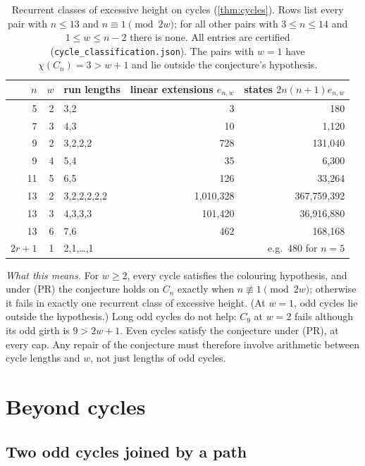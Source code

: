 \documentclass[11pt,a4paper]{article}
\theoremstyle{plain}
\theoremstyle{plain}
\newcommand{\what}[1]{\par\smallskip\noindent\textit{What this means.} #1\par\smallskip}
\begin{document}
\begin{table}[t]
\centering\small
\caption{Recurrent classes of excessive height on cycles (\cref{thm:cycles}). Rows list every pair with $n\le13$ and $n\equiv1\pmod{2w}$; for all other pairs with $3\le n\le14$ and $1\le w\le n-2$ there is none. All entries are certified (\texttt{cycle\_classification.json}). The pairs with $w=1$ have $\chi(C_n)=3>w+1$ and lie outside the conjecture's hypothesis.}
\label{tab:cycles}
\begin{tabular}{rrlrr}
\toprule
$n$ & $w$ & run lengths & linear extensions $e_{n,w}$ & states $2n(n+1)e_{n,w}$\\
\midrule
5 & 2 & 3,2 & 3 & 180\\
7 & 3 & 4,3 & 10 & 1{,}120\\
9 & 2 & 3,2,2,2 & 728 & 131{,}040\\
9 & 4 & 5,4 & 35 & 6{,}300\\
11 & 5 & 6,5 & 126 & 33{,}264\\
13 & 2 & 3,2,2,2,2,2 & 1{,}010{,}328 & 367{,}759{,}392\\
13 & 3 & 4,3,3,3 & 101{,}420 & 36{,}916{,}880\\
13 & 6 & 7,6 & 462 & 168{,}168\\
\midrule
$2r+1$ & 1 & 2,1,\dots,1 & & e.g.\ 480 for $n=5$\\
\bottomrule
\end{tabular}
\end{table}

\what{For $w\ge2$, every cycle satisfies the colouring hypothesis, and under (PR) the conjecture holds on $C_n$ exactly when $n\not\equiv1\pmod{2w}$; otherwise it fails in exactly one recurrent class of excessive height. (At $w=1$, odd cycles lie outside the hypothesis.) Long odd cycles do not help: $C_9$ at $w=2$ fails although its odd girth is $9>2w+1$. Even cycles satisfy the conjecture under (PR), at every cap. Any repair of the conjecture must therefore involve arithmetic between cycle lengths and $w$, not just lengths of odd cycles.}

\section{Beyond cycles}\label{sec:beyond}

\subsection{Two odd cycles joined by a path}\label{sec:twocycles}
\end{document}

